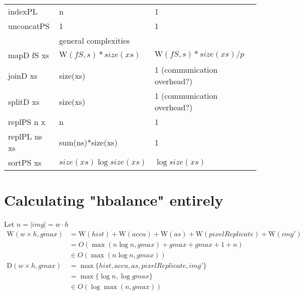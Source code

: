 \documentclass{article}
\newcommand{\W}[0]{\textrm{W}}
\newcommand{\D}[0]{\textrm{D}}
\begin{document}
\begin{table}[h]
\begin{tabular}{lll}
              indexPL         & n                   & 1 \\
              unconcatPS      & 1                   & 1 \\
              \midrule
              & general complexities & \\
              mapD fS xs      & $\W(fS,s)*size(xs)$ & $\W(fS,s)*size(xs)/p$ \\
              joinD xs        & size(xs)          & 1 \tiny (communication overhead?) \\
              splitD xs       & size(xs)          & 1 \tiny (communication overhead?) \\
              replPS n x      & n                   & 1 \\
              replPL ns xs    & sum(ns)*size(xs)    & 1 \\
              sortPS xs       & $size(xs) \log size(xs)$ & $\log size(xs)$ \\

          \end{tabular}
        \end{table}
        
    \section{Calculating "hbalance" entirely}
      Let $n = |img| = w\cdot h$
      \begin{equation}
      \begin{split}
      \W(w \times h,gmax)
            & = \W(hist) + \W(accu) + \W(as) + \W(pixelReplicate) + \W(img') \\
            & = O( \max(n \log n, gmax) + gmax + gmax + 1 + n) \\
            & \in O(\max(n \log n, gmax)) \\
      \D(w \times h,gmax)
          & = \max \{ hist, accu, as, pixelReplicate, img'\} \\
          & = \max \{\log n, \log gmax \} \\
          & \in O(\log \max(n,gmax)) \\
      \end{split}
      \end{equation}
        
\end{document}
